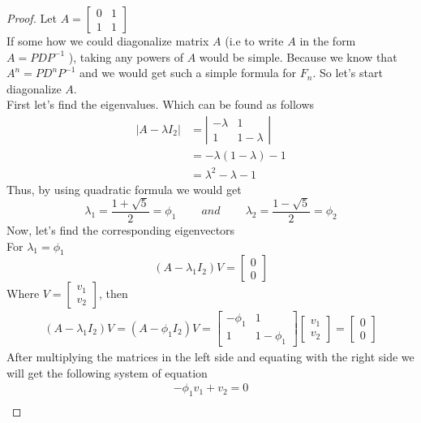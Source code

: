 \documentclass[paper=a4, fontsize=11pt,twoside]{scrartcl}		%
\theoremstyle{definition}
\theoremstyle{remark}
\begin{document}
\begin{proof}
Let $A=\left[ \begin{matrix} 0   & 1 \\ 1  & 1 \end{matrix}\right]$\\
If some how we could diagonalize matrix $A$ (i.e to write $A$ in the form $A=PDP^{-1}$ ), taking any powers of $A$ would be simple. Because we know that $A^n=PD^nP^{-1}$ and we would get such a simple formula for $F_n$. So let's start diagonalize $A$.\\
First let's find the eigenvalues. Which can be found as follows
\begin{align*}
 |A-\lambda I_2| &=\left| \begin{matrix} -\lambda   & 1 \\ 1  & 1-\lambda \end{matrix}\right|\\
                 &=-\lambda(1-\lambda)-1\\
                 &=\lambda^2 -\lambda-1
\end{align*}
Thus, by using quadratic formula we would get
$$\lambda_1=\frac{1+\sqrt{5}}{2}=\phi_1 \qquad~and~\qquad  \lambda_2=\frac{1-\sqrt{5}}{2}=\phi_2$$
Now, let's find the corresponding eigenvectors\\
For $\lambda_1=\phi_1$
$$(A-\lambda_1I_2)V=\left[ \begin{matrix} 0    \\ 0 \end{matrix}\right]$$
Where $V=\left[ \begin{matrix} v_1 \\ v_2 \end{matrix}\right]$, then
\begin{align*}
(A-\lambda_1I_2)V=(A-\phi_1I_2)V=\left[ \begin{matrix} -\phi_1 & 1    \\ 1& 1-\phi_1 \end{matrix}\right]\left[ \begin{matrix} v_1 \\ v_2 \end{matrix}\right]=\left[ \begin{matrix} 0    \\ 0 \end{matrix}\right]
\end{align*}
After multiplying the matrices in the left side and equating with the right side we will get the following system of equation
\begin{align}
-\phi_1 v_1+v_2=0\label{12}\\

\end{align}
\end{proof}
\end{document}
